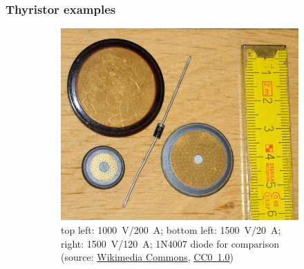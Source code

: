 \begin{frame}[b]
    \frametitle{Thyristor examples}
    \begin{figure}
        \begin{subfigure}{0.45\textwidth}
            \centering
			\includegraphics[height=0.45\textheight]{fig/lec05/Thyristor_example_01.jpg}
			\caption{top left: \SI{1000}{\volt}/\SI{200}{\ampere}; bottom left: \SI{1500}{\volt}/\SI{20}{\ampere}; right: \SI{1500}{\volt}/\SI{120}{\ampere}; 1N4007 diode for comparison (source: \href{https://de.wikipedia.org/wiki/Datei:SCR_power_rectifiers.jpg}{Wikimedia Commons}, \href{https://creativecommons.org/publicdomain/zero/1.0/}{CC0~1.0})}
        \end{subfigure}
        \hspace{1cm}
        \begin{subfigure}{0.45\textwidth}
            \centering

\end{subfigure}
\end{figure}
\end{frame}
